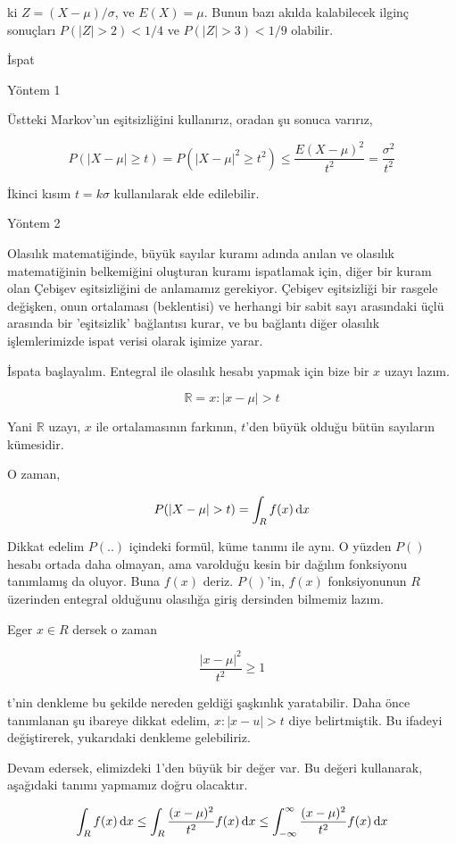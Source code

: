 \documentclass[12pt,fleqn]{article}\usepackage{../../common}
\begin{document}
ki $Z = (X-\mu)/\sigma$, ve $E(X) = \mu$. Bunun bazı akılda kalabilecek
ilginç sonuçları $P(|Z| > 2) < 1/4$ ve $P(|Z| > 3) < 1/9$ olabilir.

İspat

Yöntem 1

Üstteki Markov'un eşitsizliğini kullanırız, oradan şu sonuca varırız, 

$$ 
P(|X-\mu| \ge t) = P(|X-\mu|^2 \ge t^2 ) \le \frac{E(X-\mu)^2}{t^2} 
= \frac{\sigma^2}{t^2}  
$$

İkinci kısım $t=k\sigma$ kullanılarak elde edilebilir.

Yöntem 2

Olasılık matematiğinde, büyük sayılar kuramı adında anılan ve olasılık
matematiğinin belkemiğini oluşturan kuramı ispatlamak için, diğer bir kuram
olan Çebişev eşitsizliğini de anlamamız gerekiyor. Çebişev eşitsizliği bir
rasgele değişken, onun ortalaması (beklentisi) ve herhangi bir sabit sayı
arasındaki üçlü arasında bir 'eşitsizlik' bağlantısı kurar, ve bu bağlantı
diğer olasılık işlemlerimizde ispat verisi olarak işimize yarar.



İspata başlayalım. Entegral ile olasılık hesabı yapmak için bize bir $x$
uzayı lazım.

$$ \mathbb{R} = {x: |x-\mu| > t} $$

Yani $\mathbb{R}$ uzayı, $x$ ile ortalamasının farkının, $t$'den büyük olduğu bütün
sayıların kümesidir.

O zaman, 

$$ P(|X-\mu| > t) = \int_R f(x) \,\mathrm{d} x $$

Dikkat edelim $P(..)$ içindeki formül, küme tanımı ile aynı. O yüzden $P()$
hesabı ortada daha olmayan, ama varolduğu kesin bir dağılım fonksiyonu
tanımlamış da oluyor. Buna $f(x)$ deriz. $P()$'in, $f(x)$ fonksiyonunun $R$
üzerinden entegral olduğunu olasılığa giriş dersinden bilmemiz lazım. 

Eger $x \in R$ dersek o zaman

$$ \frac{|x-\mu|^2}{t^2} \ge 1 $$

t'nin denkleme bu şekilde nereden geldiği şaşkınlık yaratabilir. Daha önce
tanımlanan şu ibareye dikkat edelim, $x: |x-u| > t$ diye belirtmiştik. Bu
ifadeyi değiştirerek, yukarıdaki denkleme gelebiliriz.

Devam edersek, elimizdeki 1'den büyük bir değer var. Bu değeri kullanarak,
aşağıdaki tanımı yapmamız doğru olacaktır.

$$
\int_R f(x) \,\mathrm{d} x \le \int_R \frac{(x-\mu)^2}{t^2}f(x) \,\mathrm{d} x \le
\int_{-\infty}^{\infty}\frac{(x-\mu)^2}{t^2}f(x) \,\mathrm{d} x 
$$
\end{document}
